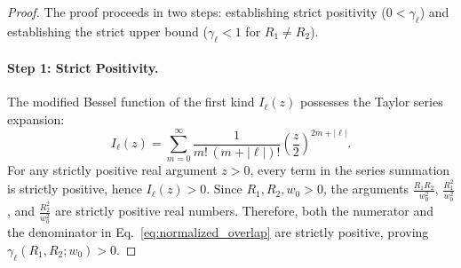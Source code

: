 \documentclass{optica-article}
\begin{document}
\begin{proof}
The proof proceeds in two steps: establishing strict positivity ($0 < \gamma_\ell$) and establishing the strict upper bound ($\gamma_\ell < 1$ for $R_1 \neq R_2$).

\paragraph{Step 1: Strict Positivity.}
The modified Bessel function of the first kind $I_\ell(z)$ possesses the Taylor series expansion:
\begin{equation}
I_\ell(z) = \sum_{m=0}^\infty \frac{1}{{m}! \, (m + |\ell|){!}} \left( \frac{z}{2} \right)^{2m + |\ell|}.
\label{eq:bessel_taylor_series}
\end{equation}
For any strictly positive real argument $z > 0$, every term in the series summation is strictly positive, hence $I_\ell(z) > 0$. Since $R_1, R_2, w_0 > 0$, the arguments $\frac{R_1 R_2}{w_0^2}$, $\frac{R_1^2}{w_0^2}$, and $\frac{R_2^2}{w_0^2}$ are strictly positive real numbers. Therefore, both the numerator and the denominator in Eq.~\eqref{eq:normalized_overlap} are strictly positive, proving $\gamma_\ell(R_1, R_2; w_0) > 0$.


\end{proof}
\end{document}
